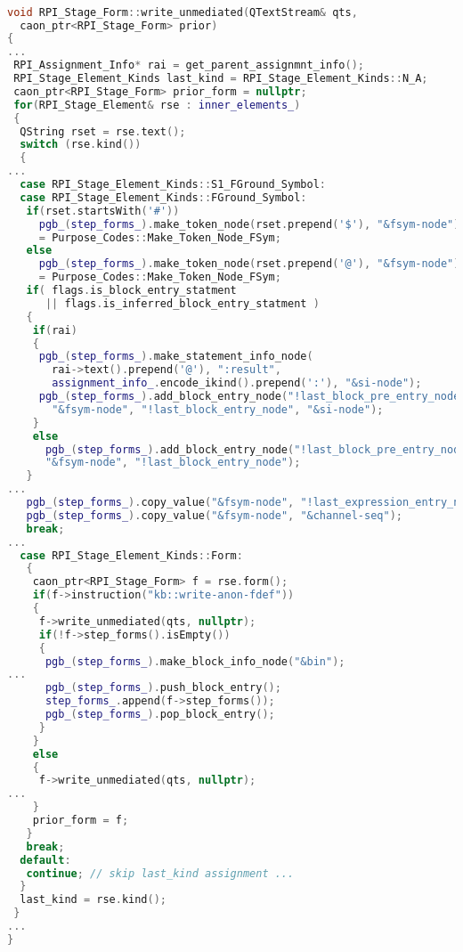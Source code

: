 \begin{lstlisting}[language = C++, numbers = none,
caption={Hypergraph IR Builder},label={lst:figPGB}, 
    basicstyle = \ttfamily\bfseries\tiny, linewidth = .95\linewidth] 

void RPI_Stage_Form::write_unmediated(QTextStream& qts, 
  caon_ptr<RPI_Stage_Form> prior)
{
...
 RPI_Assignment_Info* rai = get_parent_assignmnt_info();
 RPI_Stage_Element_Kinds last_kind = RPI_Stage_Element_Kinds::N_A;
 caon_ptr<RPI_Stage_Form> prior_form = nullptr;
 for(RPI_Stage_Element& rse : inner_elements_)
 {
  QString rset = rse.text();
  switch (rse.kind())
  {
...
  case RPI_Stage_Element_Kinds::S1_FGround_Symbol:
  case RPI_Stage_Element_Kinds::FGround_Symbol:
   if(rset.startsWith('#'))
     pgb_(step_forms_).make_token_node(rset.prepend('$'), "&fsym-node")
     = Purpose_Codes::Make_Token_Node_FSym;
   else
     pgb_(step_forms_).make_token_node(rset.prepend('@'), "&fsym-node")
     = Purpose_Codes::Make_Token_Node_FSym;
   if( flags.is_block_entry_statment
      || flags.is_inferred_block_entry_statment )
   {
    if(rai)
    {
     pgb_(step_forms_).make_statement_info_node(
       rai->text().prepend('@'), ":result",
       assignment_info_.encode_ikind().prepend(':'), "&si-node");
     pgb_(step_forms_).add_block_entry_node("!last_block_pre_entry_node",
       "&fsym-node", "!last_block_entry_node", "&si-node");
    }
    else
      pgb_(step_forms_).add_block_entry_node("!last_block_pre_entry_node",
      "&fsym-node", "!last_block_entry_node");
   }
...
   pgb_(step_forms_).copy_value("&fsym-node", "!last_expression_entry_node");
   pgb_(step_forms_).copy_value("&fsym-node", "&channel-seq");
   break;
...
  case RPI_Stage_Element_Kinds::Form:
   {
    caon_ptr<RPI_Stage_Form> f = rse.form();
    if(f->instruction("kb::write-anon-fdef"))
    {
     f->write_unmediated(qts, nullptr);
     if(!f->step_forms().isEmpty())
     {
      pgb_(step_forms_).make_block_info_node("&bin");
...
      pgb_(step_forms_).push_block_entry();
      step_forms_.append(f->step_forms());
      pgb_(step_forms_).pop_block_entry();
     }
    }
    else
    {
     f->write_unmediated(qts, nullptr);
...
    }
    prior_form = f;
   }
   break;
  default:
   continue; // skip last_kind assignment ...
  }
  last_kind = rse.kind();
 }
...
}


\end{lstlisting}
\begin{tikzpicture}[remember picture, overlay, text width=.9\linewidth]

\end{tikzpicture} 
